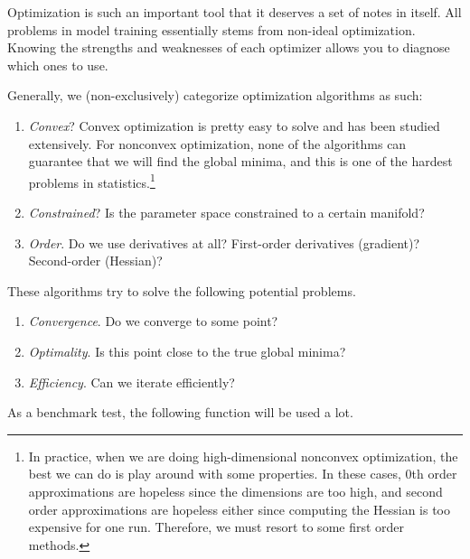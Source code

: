 Optimization is such an important tool that it deserves a set of notes in itself. All problems in model training essentially stems from non-ideal optimization. Knowing the strengths and weaknesses of each optimizer allows you to diagnose which ones to use. 

Generally, we (non-exclusively) categorize optimization algorithms as such: 
\begin{enumerate}
  \item \textit{Convex}? Convex optimization is pretty easy to solve and has been studied extensively. For nonconvex optimization, none of the algorithms can guarantee that we will find the global minima, and this is one of the hardest problems in statistics.\footnote{In practice, when we are doing high-dimensional nonconvex optimization, the best we can do is play around with some properties. In these cases, 0th order approximations are hopeless since the dimensions are too high, and second order approximations are hopeless either since computing the Hessian is too expensive for one run. Therefore, we must resort to some first order methods. } 
  \item \textit{Constrained}? Is the parameter space constrained to a certain manifold? 
  \item \textit{Order}. Do we use derivatives at all? First-order derivatives (gradient)? Second-order (Hessian)? 
\end{enumerate}

These algorithms try to solve the following potential problems. 
\begin{enumerate}
  \item \textit{Convergence}. Do we converge to some point? 
  \item \textit{Optimality}. Is this point close to the true global minima?  
  \item \textit{Efficiency}. Can we iterate efficiently? 
\end{enumerate} 

As a benchmark test, the following function will be used a lot. 

